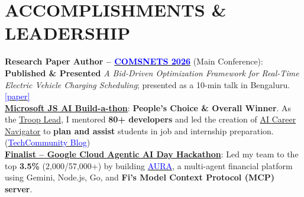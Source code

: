 \vspace{-10pt}
\section{\textbf{ACCOMPLISHMENTS \& LEADERSHIP}}
\begin{itemize}[leftmargin=0.15in, label={}]
\small{\item{

    \textbf{Research Paper Author – 
    \href{https://www.comsnets.org/accepted_papers.html}{\textcolor{blue}{COMSNETS 2026}}}{ (Main Conference): 
    \textbf{Published \& Presented} \textit{A Bid-Driven Optimization Framework for Real-Time Electric Vehicle Charging Scheduling}; presented as a 10-min talk in Bengaluru. 
    \href{https://drive.google.com/file/d/1BIn6lJDBAFv0X1xafRWhf47dfCS2loqz/view?usp=sharing}{\textcolor{blue}{[paper]}}} \\[2pt]

    \textbf{\href{https://github.com/Azure-Samples/JS-AI-Build-a-thon/blob/main/README.md}{Microsoft JS AI Build-a-thon}}{: 
    \textbf{People’s Choice \& Overall Winner}. As the
    \href{https://www.credly.com/badges/78eec55a-554b-4706-8990-261e20b92fc9/linked_in_profile}{Troop Lead}, 
    I mentored \textbf{80+ developers} and led the creation of 
    {\textcolor{blue}{\href{https://ai-career-navigator-backend.azurewebsites.net/}{AI Career Navigator}}} 
    to \textbf{plan and assist} students in job and internship preparation. 
    (\href{https://techcommunity.microsoft.com/blog/educatordeveloperblog/ai-career-navigator-%E2%80%94-empowering-job-seekers-with-azure-openai/4459774}{\textcolor{blue}{TechCommunity Blog}}) \\[2pt]
    
    

    
    \textbf{\href{https://drive.google.com/file/d/1pKSY7Rol-mGALg7XRb_uN9UDeuLEH3ZP/view?usp=sharing}{Finalist – Google Cloud Agentic AI Day Hackathon}}{: Led my team to the top \textbf{3.5\%} (2,000/57,000+) by building 
    \href{https://github.com/Aryanjstar/AURA---THE-FINANCE-AI}{\textcolor{blue}{AURA}}, a multi-agent financial platform using Gemini, Node.js, Go, and \textbf{Fi's Model Context Protocol (MCP) server}.} \\[2pt]

}}}
\end{itemize}
